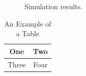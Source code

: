 \documentclass[12pt,journal,compsoc]{IEEEtran}
\begin{document}
\begin{figure}[!t]
\centering
{}
\hfil
{}
\hfil
{}
\caption{Simulation results.}
\label{fig_sim2}
\end{figure}
%


\begin{table}[!t]
\renewcommand{\arraystretch}{1.3}
\caption{An Example of a Table}
\label{table_example}
\centering
\begin{tabular}{|c||c|}
\hline
One & Two\\
\hline
Three & Four\\
\hline
\end{tabular}
\end{table}
\end{document}
